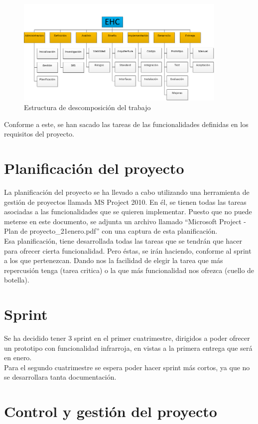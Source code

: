 \begin{figure}[h]
\includegraphics[width=0.9\textwidth]{2.GestionYPlanificacion/EDT.png}
\caption{Estructura de descomposición del trabajo}
\label{im:edt}
\end{figure}


Conforme a este, se han sacado las tareas de las funcionalidades definidas en los requisitos del proyecto. 
\section{Planificación del proyecto}
La planificación del proyecto se ha llevado a cabo utilizando una herramienta de gestión de proyectos llamada MS Project 2010. En él, se tienen todas las tareas asociadas a las funcionalidades que se quieren implementar. Puesto que no puede meterse en este documento, se adjunta un archivo llamado ``Microsoft Project - Plan de proyecto\_21enero.pdf'' con una captura de esta planificación.\\

Esa planificación, tiene desarrollada todas las tareas que se tendrán que hacer para ofrecer cierta funcionalidad. Pero éstas, se irán haciendo, conforme al sprint a los que pertenezcan. Dando nos la facilidad de elegir la tarea que más repercusión tenga (tarea critica) o la que más funcionalidad nos ofrezca (cuello de botella).
\section{Sprint }
Se ha decidido tener 3 sprint en el primer cuatrimestre, dirigidos a poder ofrecer un prototipo con funcionalidad infrarroja, en vistas a la primera entrega que será en enero.\\

Para el segundo cuatrimestre se espera poder hacer sprint más cortos, ya que no se desarrollara tanta documentación.
\section{Control y gestión del proyecto}
